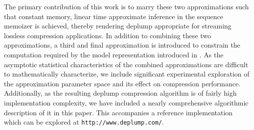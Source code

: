 The primary contribution of this work is to marry these two approximations such that constant memory, linear time approximate inference in the sequence memoizer is achieved, thereby rendering deplump appropriate for streaming lossless compression applications.  In addition to combining these two approximations, a third and final approximation is introduced to constrain the computation required by the model representation introduced in  \citep{Gasthaus2011}. As the asymptotic statistical characteristics of the combined approximations are difficult to mathematically characterize, we include significant experimental exploration of the approximation parameter space and its effect on compression performance.  Additionally, as the resulting deplump compression algorithm is of fairly high implementation complexity, we have included a nearly comprehensive algorithmic description of it in this paper.  This accompanies a reference implementation which can be explored at \texttt{http://www.deplump.com/}.

